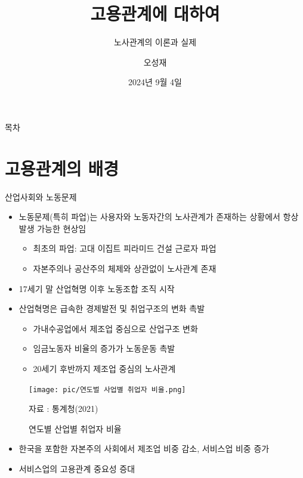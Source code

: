 \documentclass[aspectratio=169,xcolor=dvipsnames,handout]{beamer}
\title[]{고용관계에 대하여} %
\subtitle{노사관계의 이론과 실제}
\author[]{오성재}
\institute[CNU] %
{
    충남대학교 경제학과\\
}
\date{2024년 9월 4일} %
\begin{document}
\begin{frame}
    \titlepage
\end{frame}

\begin{frame}{목차}
    \tableofcontents[hideallsubsections]
\end{frame}

\section{고용관계의 배경}

\begin{frame}{산업사회와 노동문제}
    \begin{itemize}
        \item 노동문제(특히 파업)는 사용자와 노동자간의 노사관계가 존재하는 상황에서 항상 발생 가능한 현상임
        \begin{itemize}
            \item 최초의 파업: 고대 이집트 피라미드 건설 근로자 파업
            \item 자본주의나 공산주의 체제와 상관없이 노사관계 존재
        \end{itemize}
        \item 17세기 말 산업혁명 이후 노동조합 조직 시작
        \item 산업혁명은 급속한 경제발전 및 취업구조의 변화 촉발
        \begin{itemize}
            \item 가내수공업에서 제조업 중심으로 산업구조 변화
            \item 임금노동자 비율의 증가가 노동운동 촉발
            \item 20세기 후반까지 제조업 중심의 노사관계
        \end{itemize}
    \end{itemize}
\end{frame}

\begin{frame}
    \begin{figure}
        \centering
        \texttt{[image: pic/연도벌 사업별 취업자 비율.png]}
        \\
        \raggedright %
        \hspace{1em} %
        \tiny{자료 : 통계청(2021)} %
        \caption{연도별 산업별 취업자 비율}
    \end{figure}
    \begin{itemize}
        \item 한국을 포함한 자본주의 사회에서 제조업 비중 감소, 서비스업 비중 증가
        \item 서비스업의 고용관계 중요성 증대
    \end{itemize}
\end{frame}
\end{document}
